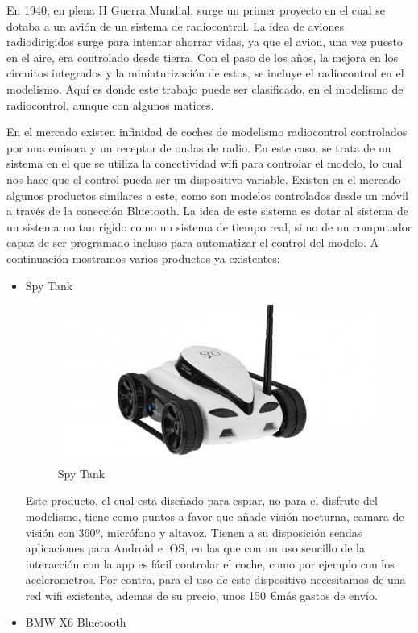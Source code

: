 \documentclass{pclass}
\begin{document}
En 1940, en plena II Guerra Mundial, surge un primer proyecto en el cual se dotaba a un avión de un sistema de radiocontrol. La idea de aviones radiodirigidos surge para intentar ahorrar vidas, ya que el avion, una vez puesto en el aire, era controlado desde tierra. Con el paso de los años, la mejora en los circuitos integrados y la miniaturización de estos, se incluye el radiocontrol en el modelismo. Aquí es donde este trabajo puede ser clasificado, en el modelismo de radiocontrol, aunque con algunos matices.

En el mercado existen infinidad de coches de modelismo radiocontrol controlados por una emisora y un receptor de ondas de radio. En este caso, se trata de un sistema en el que se utiliza la conectividad wifi para controlar el modelo, lo cual nos hace que el control pueda ser un dispositivo variable. Existen en el mercado algunos productos similares a este, como son modelos controlados desde un móvil a través de la conección Bluetooth. La idea de este sistema es dotar al sistema de un sistema no tan rígido como un sistema de tiempo real, si no de un computador capaz de ser programado incluso para automatizar el control del modelo. A continuación mostramos varios productos ya existentes:



\begin{itemize}
    \item Spy Tank


\begin{figure}[H]
  \centering
    \includegraphics[width=1.1\textwidth]{img/producto1}
  \caption{Spy Tank}
  \label{fig:SpyTank}
\end{figure}



Este producto, el cual está diseñado para espiar, no para el disfrute del modelismo, tiene como puntos a favor que añade visión nocturna, camara de visión con 360º, micrófono y altavoz. Tienen a su disposición sendas aplicaciones para Android e iOS, en las que con un uso sencillo de la interacción con la app es fácil controlar el coche, como por ejemplo con los acelerometros. Por contra, para el uso de este dispositivo necesitamos de una red wifi existente, ademas de su precio, unos 150 \euro más gastos de envío.



    \item BMW X6 Bluetooth
\end{itemize}
\end{document}
